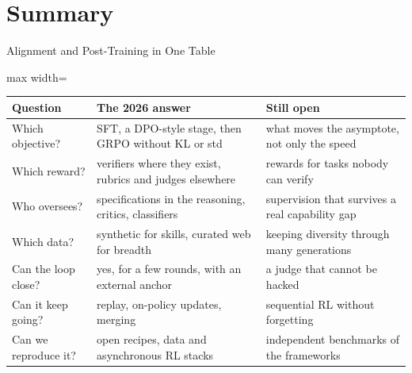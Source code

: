 \section{Summary}

\begin{frame}{Alignment and Post-Training in One Table}
    \begin{center}
    \footnotesize
    \renewcommand{\arraystretch}{1.15}
    \begin{adjustbox}{max width=\linewidth}\begin{tabular}{>{\raggedright\arraybackslash}p{2.7cm}>{\raggedright\arraybackslash}p{5.4cm}>{\raggedright\arraybackslash}p{5.2cm}}
        \toprule
        \textbf{Question} & \textbf{The 2026 answer} & \textbf{Still open} \\
        \midrule
        Which objective? & SFT, a DPO-style stage, then GRPO without KL or std & what moves the asymptote, not only the speed \\
        Which reward? & verifiers where they exist, rubrics and judges elsewhere & rewards for tasks nobody can verify \\
        Who oversees? & specifications in the reasoning, critics, classifiers & supervision that survives a real capability gap \\
        Which data? & synthetic for skills, curated web for breadth & keeping diversity through many generations \\
        Can the loop close? & yes, for a few rounds, with an external anchor & a judge that cannot be hacked \\
        Can it keep going? & replay, on-policy updates, merging & sequential RL without forgetting \\
        Can we reproduce it? & open recipes, data and asynchronous RL stacks & independent benchmarks of the frameworks \\
        \bottomrule
    \end{tabular}\end{adjustbox}
    \end{center}
    \vspace{0.13em}
\end{frame}

